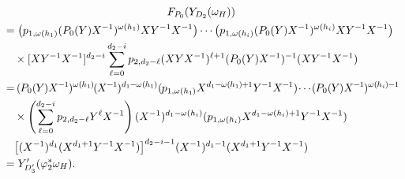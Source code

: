 \documentclass[ALCO,ThmDefs,Unicode,epreuves]{cedram}
\newcommand*{\mk}{\mkern -1mu}
\newcommand*{\Mk}{\mkern -2mu}
\begin{document}
\begin{multline*}
 F_{P_0}(Y_{D_2}(\omega_H))\\
\begin{aligned}
 &=\big(p_{1,\omega(h_1)}(P_0(Y)X^{-1})^{\omega(h_1)}XY^{-1}X^{-1}\big)\cdots\big(p_{1,\omega(h_i)}(P_0(Y)X^{-1})^{\omega(h_i)}XY^{-1}X^{-1}\big)\\
 &\quad\times[XY^{-1}X^{-1}]^{d_2-i}\sum\limits_{\ell=0}^{d_2-i} p_{2,d_2-\ell}(XYX^{-1})^{\ell+1}(P_0(Y)X^{-1})^{-1}(XY^{-1}X^{-1})\\
 &=\Mk(\mk P_0(\mk Y\mk )X^{\mk -\mk 1}\mk )^{\omega(\mk h_1\mk ) }\Mk (\mk X^{\mk -\mk 1}\mk )^{d_1\mk -\mk \omega(\mk h_1\mk )}(\mk p_{1,\omega(h_1\mk )}X^{d_1\mk -\mk \omega(\mk h_1\mk )\mk +\mk 1}Y^{\mk -\mk 1}X^{\mk -\mk 1})\Mk \cdots\Mk (\mk P_0(\mk Y\mk )X^{\mk -\mk 1}\mk )^{\omega(\mk h_i\mk )\mk -\mk 1}\\
 &\quad\times\left(\sum\limits_{\ell=0}^{d_2-i} p_{2,d_2-\ell} Y^\ell X^{-1}\right)(X^{-1})^{d_1-\omega(h_i)}(p_{1,\omega(h_i)}X^{d_1-\omega(h_i)+1}Y^{-1}X^{-1})\\
 &\quad\big[(X^{-1})^{d_1}(X^{d_1+1}Y^{-1}X^{-1})\big]^{d_2-i-1}(X^{-1})^{d_1-1}(X^{d_1+1}Y^{-1}X^{-1})\\
 &=Y'_{D'_3}(\varphi^*_2\omega_H).
\end{aligned}
\end{multline*}
\end{document}
